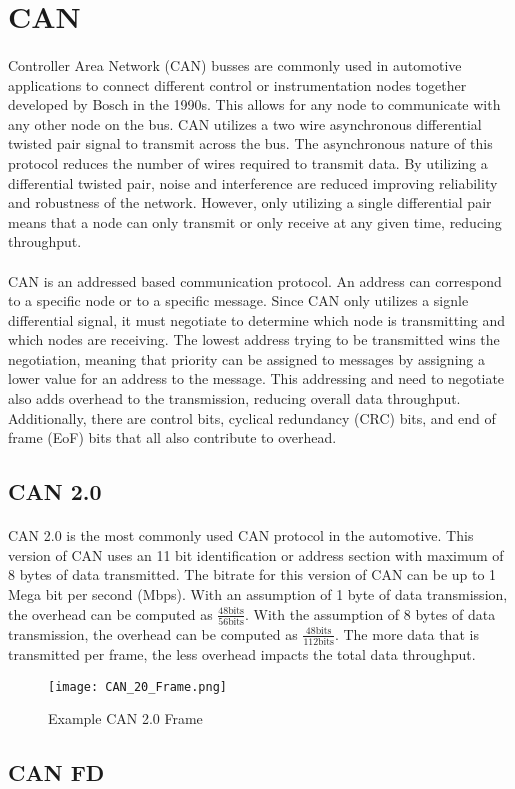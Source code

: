 \section{CAN}

\paragraph{}
Controller Area Network (CAN) busses are commonly used in automotive applications to connect different control or instrumentation nodes together developed by Bosch in the 1990s.
This allows for any node to communicate with any other node on the bus.
CAN utilizes a two wire asynchronous differential twisted pair signal to transmit across the bus.
The asynchronous nature of this protocol reduces the number of wires required to transmit data.
By utilizing a differential twisted pair, noise and interference are reduced improving reliability and robustness of the network.
However, only utilizing a single differential pair means that a node can only transmit or only receive at any given time, reducing throughput.

\paragraph{}
CAN is an addressed based communication protocol.
An address can correspond to a specific node or to a specific message.
Since CAN only utilizes a signle differential signal, it must negotiate to determine which node is transmitting and which nodes are receiving.
The lowest address trying to be transmitted wins the negotiation, meaning that priority can be assigned to messages by assigning a lower value for an address to the message.
This addressing and need to negotiate also adds overhead to the transmission, reducing overall data throughput.
Additionally, there are control bits, cyclical redundancy (CRC) bits, and end of frame (EoF) bits that all also contribute to overhead.

\subsection{CAN 2.0}

\paragraph{}
CAN 2.0 is the most commonly used CAN protocol in the automotive.
This version of CAN uses an 11 bit identification or address section with maximum of 8 bytes of data transmitted.
The bitrate for this version of CAN can be up to 1 Mega bit per second (Mbps).
With an assumption of 1 byte of data transmission, the overhead can be computed as $\frac{48 \text{bits}}{56 \text{bits}}$.  With the assumption of 8 bytes of data transmission, the overhead can be computed as $\frac{48 \text{bits}}{112 \text{bits}}$.
The more data that is transmitted per frame, the less overhead impacts the total data throughput.

\begin{figure}[H]
	\centering
	\texttt{[image: CAN\_20\_Frame.png]}
	\caption{Example CAN 2.0 Frame \cite{wikipediaCAN}}
	\label{fig:CompressionPipeline}
\end{figure}

\subsection{CAN FD}